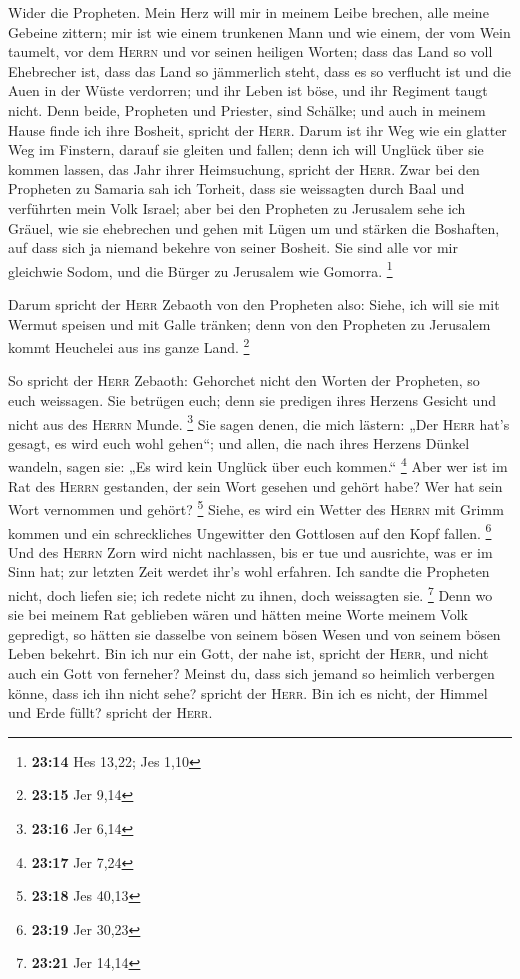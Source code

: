  Wider die Propheten. Mein Herz will mir in meinem Leibe
brechen, alle meine Gebeine zittern; mir ist wie einem trunkenen Mann
und wie einem, der vom Wein taumelt, vor dem \textsc{Herrn} und vor
seinen heiligen Worten;  dass das Land so voll Ehebrecher
ist, dass das Land so jämmerlich steht, dass es so verflucht ist und die
Auen in der Wüste verdorren; und ihr Leben ist böse, und ihr Regiment
taugt nicht.  Denn beide, Propheten und Priester, sind
Schälke; und auch in meinem Hause finde ich ihre Bosheit, spricht der
\textsc{Herr}.  Darum ist ihr Weg wie ein glatter Weg im
Finstern, darauf sie gleiten und fallen; denn ich will Unglück über sie
kommen lassen, das Jahr ihrer Heimsuchung, spricht der \textsc{Herr}.
 Zwar bei den Propheten zu Samaria sah ich Torheit, dass
sie weissagten durch Baal und verführten mein Volk Israel;
 aber bei den Propheten zu Jerusalem sehe ich Gräuel, wie
sie ehebrechen und gehen mit Lügen um und stärken die Boshaften, auf
dass sich ja niemand bekehre von seiner Bosheit. Sie sind alle vor mir
gleichwie Sodom, und die Bürger zu Jerusalem wie Gomorra. \footnote{\textbf{23:14}
  Hes 13,22; Jes 1,10}

 Darum spricht der \textsc{Herr} Zebaoth von den
Propheten also: Siehe, ich will sie mit Wermut speisen und mit Galle
tränken; denn von den Propheten zu Jerusalem kommt Heuchelei aus ins
ganze Land. \footnote{\textbf{23:15} Jer 9,14}

 So spricht der \textsc{Herr} Zebaoth: Gehorchet nicht
den Worten der Propheten, so euch weissagen. Sie betrügen euch; denn sie
predigen ihres Herzens Gesicht und nicht aus des \textsc{Herrn} Munde.
\footnote{\textbf{23:16} Jer 6,14}  Sie sagen denen, die
mich lästern: „Der \textsc{Herr} hat's gesagt, es wird euch wohl
gehen``; und allen, die nach ihres Herzens Dünkel wandeln, sagen sie:
„Es wird kein Unglück über euch kommen.`` \footnote{\textbf{23:17} Jer
  7,24}  Aber wer ist im Rat des \textsc{Herrn}
gestanden, der sein Wort gesehen und gehört habe? Wer hat sein Wort
vernommen und gehört? \footnote{\textbf{23:18} Jes 40,13}
 Siehe, es wird ein Wetter des \textsc{Herrn} mit Grimm
kommen und ein schreckliches Ungewitter den Gottlosen auf den Kopf
fallen. \footnote{\textbf{23:19} Jer 30,23}  Und des
\textsc{Herrn} Zorn wird nicht nachlassen, bis er tue und ausrichte, was
er im Sinn hat; zur letzten Zeit werdet ihr's wohl erfahren.
 Ich sandte die Propheten nicht, doch liefen sie; ich
redete nicht zu ihnen, doch weissagten sie. \footnote{\textbf{23:21} Jer
  14,14}  Denn wo sie bei meinem Rat geblieben wären und
hätten meine Worte meinem Volk gepredigt, so hätten sie dasselbe von
seinem bösen Wesen und von seinem bösen Leben bekehrt. 
Bin ich nur ein Gott, der nahe ist, spricht der \textsc{Herr}, und nicht
auch ein Gott von ferneher?  Meinst du, dass sich jemand
so heimlich verbergen könne, dass ich ihn nicht sehe? spricht der
\textsc{Herr}. Bin ich es nicht, der Himmel und Erde füllt? spricht der
\textsc{Herr}.

